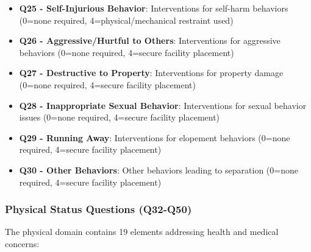 \begin{itemize}
    \item \textbf{Q25 - Self-Injurious Behavior}: Interventions for self-harm behaviors (0=none required, 4=physical/mechanical restraint used)
    \item \textbf{Q26 - Aggressive/Hurtful to Others}: Interventions for aggressive behaviors (0=none required, 4=secure facility placement)
    \item \textbf{Q27 - Destructive to Property}: Interventions for property damage (0=none required, 4=secure facility placement)
    \item \textbf{Q28 - Inappropriate Sexual Behavior}: Interventions for sexual behavior issues (0=none required, 4=secure facility placement)
    \item \textbf{Q29 - Running Away}: Interventions for elopement behaviors (0=none required, 4=secure facility placement)
    \item \textbf{Q30 - Other Behaviors}: Other behaviors leading to separation (0=none required, 4=secure facility placement)
\end{itemize}

\subsubsection{Physical Status Questions (Q32-Q50)}

The physical domain contains 19 elements addressing health and medical concerns:

